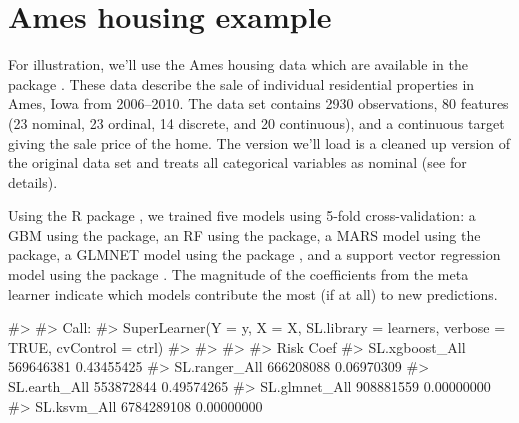 \section{Ames housing example}

For illustration, we'll use the Ames housing data \citep{ames-cock-2011}
which are available in the  package
\citep{R-AmesHousing}. These data describe the sale of individual
residential properties in Ames, Iowa from 2006--2010. The data set
contains 2930 observations, 80 features (23 nominal, 23 ordinal, 14
discrete, and 20 continuous), and a continuous target giving the sale
price of the home. The version we'll load is a cleaned up version of the
original data set and treats all categorical variables as nominal (see
 for details).

Using the R package  \citep{R-SuperLearner}, we
trained five models using 5-fold cross-validation: a GBM using the
 package, an RF using the  package, a MARS
model using the  package, a GLMNET model using the
 package \citep{R-glmnet}, and a support vector
regression model using the  package \citep{R-kernlab}.
The magnitude of the coefficients from the meta learner indicate which
models contribute the most (if at all) to new predictions.

\begin{Schunk}
\begin{Soutput}
#> 
#> Call:  
#> SuperLearner(Y = y, X = X, SL.library = learners, verbose = TRUE, cvControl = ctrl) 
#> 
#> 
#> 
#>                      Risk       Coef
#> SL.xgboost_All  569646381 0.43455425
#> SL.ranger_All   666208088 0.06970309
#> SL.earth_All    553872844 0.49574265
#> SL.glmnet_All   908881559 0.00000000
#> SL.ksvm_All    6784289108 0.00000000
\end{Soutput}
\end{Schunk}

